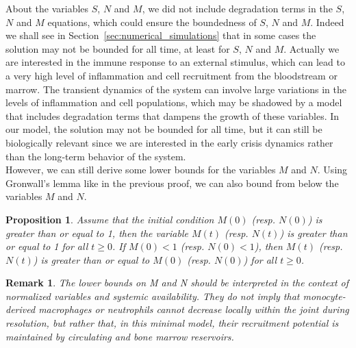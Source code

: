 \documentclass[a4paper, 12pt]{article}
\newtheorem{rem}{Remark}[section]
\newtheorem{proposition}{Proposition}[section]
\begin{document}
About the variables $S$, $N$ and $M$, we did not  include degradation terms in the $S$, $N$ and  $M$ equations, which could ensure the boundedness of $S$, $N$ and $M$.
    Indeed we shall see in Section~\ref{sec:numerical_simulations} that in some cases the solution may not be bounded for all time, at least for $S$, $N$ and $M$.
     Actually we are interested in the  immune response to an external stimulus, which can lead to a very high level of inflammation and cell recruitment from the bloodstream or marrow. 
     The transient dynamics of the system can involve large variations in the levels of inflammation and cell populations, which may be shadowed by a model that includes degradation terms that dampens the growth of these variables.
    In our model, the solution may not be bounded for all time,
     but it can still be biologically relevant since we are interested in the early crisis dynamics 
     rather than the long-term behavior of the system.\\
However, we can still derive some lower bounds for the variables $M$ and $N$.    
Using Gronwall's lemma like in the previous proof, we can also bound from below the variables $M$ and  $N$.
\begin{proposition}\label{prop:lower_bounds}
Assume that the initial condition $M(0)$ (resp. $N(0)$) is greater than or equal to 1, then
the variable $M(t)$ (resp. $N(t)$) is greater than or equal to 1 for all $t \geq 0$. If $M(0) < 1$ (resp. $N(0) < 1$), then $M(t)$ (resp. $N(t)$) is greater than or equal to $M(0)$ (resp. $N(0)$) for all $t \geq 0$.    
\end{proposition}
\begin{rem}
The lower bounds on M and N should be interpreted in the context of normalized variables and systemic availability.
 They do not imply that monocyte-derived macrophages or neutrophils cannot decrease locally within the joint during resolution, but rather that, in this minimal model,
  their recruitment potential is maintained by circulating and bone marrow reservoirs.

\end{rem}
\end{document}
